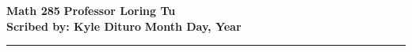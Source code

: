\documentclass[12pt, twosided]{article}
\begin{document}
\noindent \textbf{Math 285} \hfill \textbf{Professor Loring Tu} \\
\textbf{Scribed by: Kyle Dituro} \hfill \textbf{Month Day\tht, Year}\hrule
\vspace{.2in}
\end{document}
